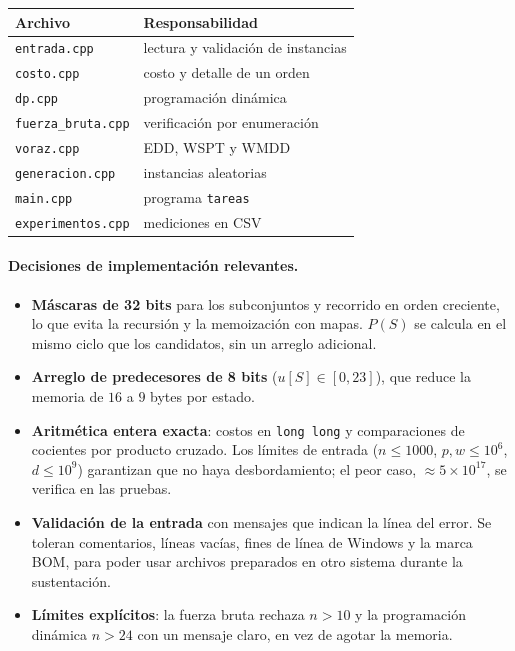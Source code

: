 \documentclass[10pt,twocolumn,letterpaper]{article}
\begin{document}
\begin{center}
\small
\begin{tabular}{ll}
\toprule
Archivo & Responsabilidad\\
\midrule
\texttt{entrada.cpp} & lectura y validación de instancias\\
\texttt{costo.cpp} & costo y detalle de un orden\\
\texttt{dp.cpp} & programación dinámica\\
\texttt{fuerza\_bruta.cpp} & verificación por enumeración\\
\texttt{voraz.cpp} & EDD, WSPT y WMDD\\
\texttt{generacion.cpp} & instancias aleatorias\\
\texttt{main.cpp} & programa \texttt{tareas}\\
\texttt{experimentos.cpp} & mediciones en CSV\\
\bottomrule
\end{tabular}
\end{center}

\paragraph{Decisiones de implementación relevantes.}
\begin{itemize}
  \item \textbf{Máscaras de 32 bits} para los subconjuntos y recorrido en
        orden creciente, lo que evita la recursión y la memoización con mapas.
        $P(S)$ se calcula en el mismo ciclo que los candidatos, sin un
        arreglo adicional.
  \item \textbf{Arreglo de predecesores de 8 bits} ($u[S]\in[0,23]$), que
        reduce la memoria de $16$ a $9$ bytes por estado.
  \item \textbf{Aritmética entera exacta}: costos en \texttt{long long} y
        comparaciones de cocientes por producto cruzado. Los límites de
        entrada ($n\le1000$, $p,w\le10^6$, $d\le10^9$) garantizan que no haya
        desbordamiento; el peor caso, $\approx5\times10^{17}$, se verifica en
        las pruebas.
  \item \textbf{Validación de la entrada} con mensajes que indican la línea
        del error. Se toleran comentarios, líneas vacías, fines de línea de
        Windows y la marca BOM, para poder usar archivos preparados en otro
        sistema durante la sustentación.
  \item \textbf{Límites explícitos}: la fuerza bruta rechaza $n>10$ y la
        programación dinámica $n>24$ con un mensaje claro, en vez de
        agotar la memoria.
\end{itemize}
\end{document}

